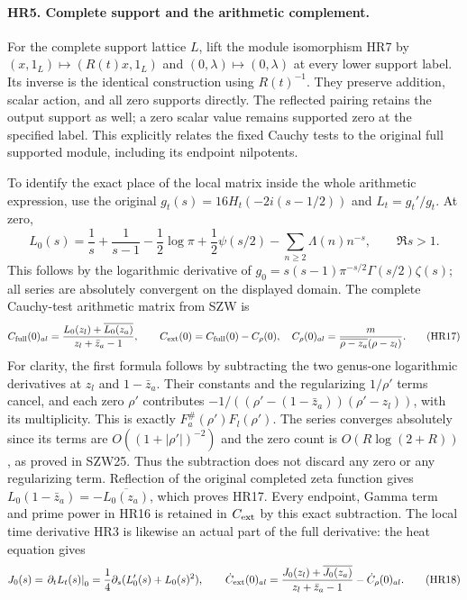 \paragraph{HR5. Complete support and the arithmetic complement.}
For the complete support lattice $L$, lift the module isomorphism
HR7 by $(x,1_L)\mapsto(R(t)x,1_L)$ and
$(0,\lambda)\mapsto(0,\lambda)$ at every lower support label.
Its inverse is the identical construction using $R(t)^{-1}$.
They preserve addition, scalar action, and all zero supports
directly. The reflected pairing retains the output support as
well; a zero scalar value remains supported zero at the specified
label. This explicitly relates the fixed Cauchy tests to the
original full supported module, including its endpoint nilpotents.

To identify the exact place of the local matrix inside the whole
arithmetic expression, use the original $g_t(s)=16H_t(-2i(s-1/2))$
and $L_t=g_t'/g_t$. At zero,
\[
 L_0(s)=\frac1s+\frac1{s-1}-\frac12\log\pi
        +\frac12\psi(s/2)-\sum_{n\ge2}\Lambda(n)n^{-s},
       \qquad\Re s>1.
 \tag{HR16}
\]
This follows by the logarithmic derivative of
$g_0=s(s-1)\pi^{-s/2}\Gamma(s/2)\zeta(s)$; all series are
absolutely convergent on the displayed domain. The complete
Cauchy-test arithmetic matrix from SZW is
\[
 C_{\rm full}(0)_{al}
  =\frac{L_0(z_l)+\overline{L_0(z_a)}}{z_l+\bar z_a-1},
 \qquad C_{\rm ext}(0)=C_{\rm full}(0)-C_\rho(0),
 \quad C_\rho(0)_{al}=
 \frac{m}{\overline{\rho-z_a}(\rho-z_l)}.
 \tag{HR17}
\]
For clarity, the first formula follows by subtracting the two
genus-one logarithmic derivatives at $z_l$ and $1-\bar z_a$.
Their constants and the regularizing $1/\rho'$ terms cancel,
and each zero $\rho'$ contributes
$-1/((\rho'-(1-\bar z_a))(\rho'-z_l))$, with its multiplicity.
This is exactly $F_a^\#(\rho')F_l(\rho')$.
The series converges absolutely since its terms are
$O((1+|\rho'|)^{-2})$ and the zero count is
$O(R\log(2+R))$, as proved in SZW25. Thus the subtraction does
not discard any zero or any regularizing term. Reflection of the
original completed zeta function gives
$L_0(1-\bar z_a)=-\overline{L_0(z_a)}$, which proves HR17.
Every endpoint, Gamma term and prime power in HR16 is retained
in $C_{\rm ext}$ by this exact subtraction. The local time
derivative HR3 is likewise an actual part of the full derivative:
the heat equation gives
\[
 J_0(s)=\left.\partial_tL_t(s)\right|_0
       =\frac14\partial_s(L_0'(s)+L_0(s)^2),\qquad
 \dot C_{\rm ext}(0)_{al}=
 \frac{J_0(z_l)+\overline{J_0(z_a)}}{z_l+\bar z_a-1}
       -\dot C_\rho(0)_{al}.
 \tag{HR18}
\]
